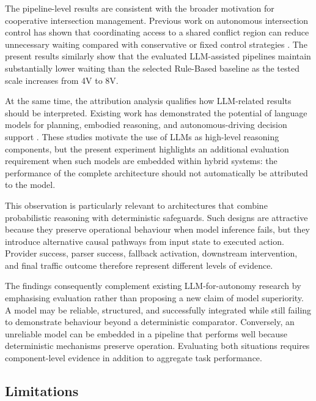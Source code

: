\documentclass[letterpaper,10pt,conference]{ieeeconf}
\begin{document}
The pipeline-level results are consistent with the broader motivation for cooperative intersection management. Previous work on autonomous intersection control has shown that coordinating access to a shared conflict region can reduce unnecessary waiting compared with conservative or fixed control strategies \cite{Dresner2008,Safarov2022,Zhao2025}. The present results similarly show that the evaluated LLM-assisted pipelines maintain substantially lower waiting than the selected Rule-Based baseline as the tested scale increases from 4V to 8V.



At the same time, the attribution analysis qualifies how LLM-related results should be interpreted. Existing work has demonstrated the potential of language models for planning, embodied reasoning, and autonomous-driving decision support \cite{Huang2022,Driess2023,Wen2023,Jin2023,Cui2024}. These studies motivate the use of LLMs as high-level reasoning components, but the present experiment highlights an additional evaluation requirement when such models are embedded within hybrid systems: the performance of the complete architecture should not automatically be attributed to the model.



This observation is particularly relevant to architectures that combine probabilistic reasoning with deterministic safeguards. Such designs are attractive because they preserve operational behaviour when model inference fails, but they introduce alternative causal pathways from input state to executed action. Provider success, parser success, fallback activation, downstream intervention, and final traffic outcome therefore represent different levels of evidence.



The findings consequently complement existing LLM-for-autonomy research by emphasising evaluation rather than proposing a new claim of model superiority. A model may be reliable, structured, and successfully integrated while still failing to demonstrate behaviour beyond a deterministic comparator. Conversely, an unreliable model can be embedded in a pipeline that performs well because deterministic mechanisms preserve operation. Evaluating both situations requires component-level evidence in addition to aggregate task performance.



\subsection{Limitations}
\end{document}
